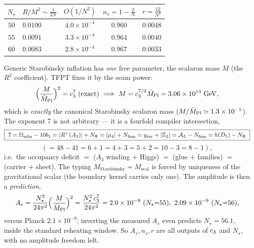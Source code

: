 \begin{center}\small
\begin{tabularx}{0.8\linewidth}{@{}cYccc@{}}
\toprule
$N_\star$ & $R/M^2\sim\tfrac1{2N}$ & $O(1/N^2)$ & $n_s=1-\tfrac2N$ & $r=\tfrac{12}{N^2}$ \\
\midrule
$50$ & $0.0100$ & $4.0\times10^{-4}$ & $0.960$ & $0.0048$ \\
$55$ & $0.0091$ & $3.3\times10^{-4}$ & $0.964$ & $0.0040$ \\
$60$ & $0.0083$ & $2.8\times10^{-4}$ & $0.967$ & $0.0033$ \\
\bottomrule
\end{tabularx}
\end{center}

\begin{winbox}
Generic Starobinsky inflation has \emph{one} free parameter, the scalaron mass $M$ (the $R^2$
coefficient). TFPT fixes it by the seam power:
\[
  \Bigl(\frac{M}{\Mbar}\Bigr)^2=\cthree^7\ \text{(exact)}\ \Longrightarrow\ M=\cthree^{7/2}\Mbar
  =3.06\times10^{13}\ \mathrm{GeV},
\]
which is \emph{exactly} the canonical Starobinsky scalaron mass ($M/\bar M_{\mathrm{Pl}}\simeq1.3\times10^{-5}$). The
exponent $7$ is not arbitrary --- it is a fourfold compiler intersection,
\[
  \boxed{\ 7=\Oadm-10b_1=|R^+(A_3)|+N_\Phi=|\mu_4|+\Nfam=\gcar+|\Z_2|=\mathcal A_L-\Nfam=h(D_5)-N_\Phi\ }
\]
\[
  (=48{-}41=6{+}1=4{+}3=5{+}2=10{-}3=8{-}1),
\]
i.e.\ the occupancy deficit $=$ ($A_3$ winding $+$ Higgs) $=$ (glue $+$ families) $=$ (carrier $+$ sheet).
The typing $M_{\mathrm{Starobinsky}}=M_{\mathrm{scal}}$ is forced by uniqueness of the gravitational scalar
(the boundary kernel carries only one). The amplitude is then a \emph{prediction},
\[
  A_s=\frac{N_\star^2}{24\pi^2}\Bigl(\frac{M}{\Mbar}\Bigr)^2=\frac{N_\star^2\,\cthree^7}{24\pi^2}
  =2.0\times10^{-9}\ (N_\star{=}55),\ 2.09\times10^{-9}\ (N_\star{=}56),
\]
versus Planck $2.1\times10^{-9}$; inverting the measured $A_s$ even predicts $N_\star=56.1$, inside the
standard reheating window. So $A_s,n_s,r$ are all outputs of $c_3$ and $N_\star$, with no amplitude
freedom left.
\end{winbox}

